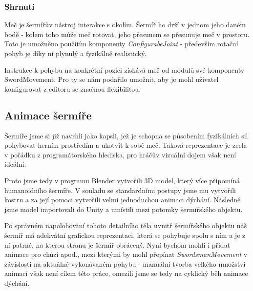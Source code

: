 \subsubsection*{Shrnutí}

Meč je šermířův nástroj interakce s okolím. Šermíř ho drží v jednom jeho daném bodě - kolem toho může meč rotovat, jeho přesunem se přesunuje meč v prostoru. Toto je umožněno použitím komponenty \textit{ConfigurabeJoint} - především rotační pohyb je díky ní plynulý a fyzikálně realistický. 

Instrukce k pohybu na konkrétní pozici získává meč od modulů své komponenty SwordMovement. Pro ty se nám podařilo umožnit, aby je mohl uživatel konfigurovat z editoru se značnou flexibilitou.



\subsection{Animace šermíře} \label{swordsmanAnimationSubsection}

Šermíře jsme si již navrhli jako kapsli, jež je schopna se působením fyzikálních sil pohybovat herním prostředím a ukotvit k sobě meč. Taková reprezentace je zcela v pořádku z programátorského hlediska, pro hráčův vizuální dojem však není ideální.

Proto jsme tedy v programu Blender \cite{Blender} vytvořili 3D model, který více připomíná humanoidního šermíře. V souladu se standardními postupy jsme mu vytvořili kostru a za její pomoci vytvořili velmi jednoduchou animaci dýchání. Následně jsme model importovali do Unity a umístili mezi potomky šermířského objektu.

Po správném napolohování tohoto detailního těla uvnitř šermířského objektu náš šermíř má adekvátní grafickou reprezentaci, která se pohybuje spolu s ním a je z ní patrné, na kterou stranu je šermíř obrácený. Nyní bychom mohli i přidat animace pro chůzi apod., mezi kterými by mohl přepínat \textit{SwordsmanMovement} v závislosti na aktuálně vykonávaném pohybu - manuální tvorba velkého množství animací však není cílem této práce, omezili jsme se tedy na cyklický běh animace dýchání. 

